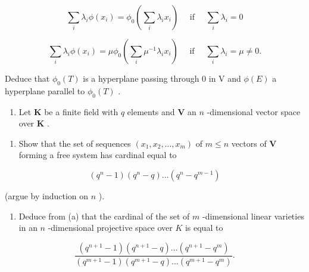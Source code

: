 \[
\sum_ {i} \lambda_ {i} \phi (x _ {i}) = \phi_ {0} \left(\sum_ {i} \lambda_ {i} x _ {i}\right) \quad \text { if } \quad \sum_ {i} \lambda_ {i} = 0
\]

\[
\sum_ {i} \lambda_ {i} \phi (x _ {i}) = \mu \phi_ {0} \left(\sum_ {i} \mu^ {- 1} \lambda_ {i} x _ {i}\right) \quad \text { if } \quad \sum_ {i} \lambda_ {i} = \mu \neq 0.
\]

Deduce that \(\phi_{0}(T)\) is a hyperplane passing through 0 in V and \(\phi(E)\) a hyperplane parallel to \(\phi_{0}(T)\) .

\begin{enumerate}
\def\labelenumi{\arabic{enumi}.}
\setcounter{enumi}{8}
\tightlist
\item
  Let \(\mathbf{K}\) be a finite field with \(q\) elements and \(\mathbf{V}\) an \(n\) -dimensional vector space over \(\mathbf{K}\) .
\end{enumerate}

\begin{enumerate}
\def\labelenumi{(\alph{enumi})}
\tightlist
\item
  Show that the set of sequences \((x_{1}, x_{2}, \ldots, x_{m})\) of \(m \leqslant n\) vectors of \(\mathbf{V}\) forming a free system has cardinal equal to
\end{enumerate}

\[
(q ^ {n} - 1) (q ^ {n} - q) \dots (q ^ {n} - q ^ {m - 1})
\]

(argue by induction on \(n\) ).

\begin{enumerate}
\def\labelenumi{(\alph{enumi})}
\setcounter{enumi}{1}
\tightlist
\item
  Deduce from (a) that the cardinal of the set of \(m\) -dimensional linear varieties in an \(n\) -dimensional projective space over \(K\) is equal to
\end{enumerate}

\[
\frac {(q ^ {n + 1} - 1) (q ^ {n + 1} - q) \dots (q ^ {n + 1} - q ^ {m})}{(q ^ {m + 1} - 1) (q ^ {m + 1} - q) \dots (q ^ {m + 1} - q ^ {m})}.
\]

